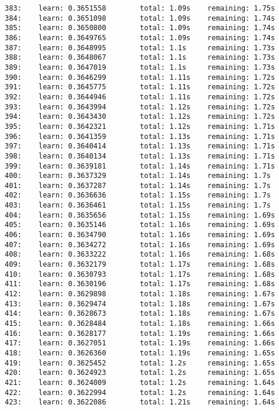 \documentclass[11pt]{article}
\begin{document}
\begin{Verbatim}[commandchars=\\\{\}]
383:    learn: 0.3651558        total: 1.09s    remaining: 1.75s
384:    learn: 0.3651098        total: 1.09s    remaining: 1.74s
385:    learn: 0.3650800        total: 1.09s    remaining: 1.74s
386:    learn: 0.3649765        total: 1.09s    remaining: 1.74s
387:    learn: 0.3648995        total: 1.1s     remaining: 1.73s
388:    learn: 0.3648067        total: 1.1s     remaining: 1.73s
389:    learn: 0.3647019        total: 1.1s     remaining: 1.73s
390:    learn: 0.3646299        total: 1.11s    remaining: 1.72s
391:    learn: 0.3645775        total: 1.11s    remaining: 1.72s
392:    learn: 0.3644946        total: 1.11s    remaining: 1.72s
393:    learn: 0.3643994        total: 1.12s    remaining: 1.72s
394:    learn: 0.3643430        total: 1.12s    remaining: 1.72s
395:    learn: 0.3642321        total: 1.12s    remaining: 1.71s
396:    learn: 0.3641359        total: 1.13s    remaining: 1.71s
397:    learn: 0.3640414        total: 1.13s    remaining: 1.71s
398:    learn: 0.3640134        total: 1.13s    remaining: 1.71s
399:    learn: 0.3639181        total: 1.14s    remaining: 1.71s
400:    learn: 0.3637329        total: 1.14s    remaining: 1.7s
401:    learn: 0.3637287        total: 1.14s    remaining: 1.7s
402:    learn: 0.3636636        total: 1.15s    remaining: 1.7s
403:    learn: 0.3636461        total: 1.15s    remaining: 1.7s
404:    learn: 0.3635656        total: 1.15s    remaining: 1.69s
405:    learn: 0.3635146        total: 1.16s    remaining: 1.69s
406:    learn: 0.3634790        total: 1.16s    remaining: 1.69s
407:    learn: 0.3634272        total: 1.16s    remaining: 1.69s
408:    learn: 0.3633222        total: 1.16s    remaining: 1.68s
409:    learn: 0.3632179        total: 1.17s    remaining: 1.68s
410:    learn: 0.3630793        total: 1.17s    remaining: 1.68s
411:    learn: 0.3630196        total: 1.17s    remaining: 1.68s
412:    learn: 0.3629898        total: 1.18s    remaining: 1.67s
413:    learn: 0.3629474        total: 1.18s    remaining: 1.67s
414:    learn: 0.3628673        total: 1.18s    remaining: 1.67s
415:    learn: 0.3628484        total: 1.18s    remaining: 1.66s
416:    learn: 0.3628177        total: 1.19s    remaining: 1.66s
417:    learn: 0.3627051        total: 1.19s    remaining: 1.66s
418:    learn: 0.3626360        total: 1.19s    remaining: 1.65s
419:    learn: 0.3625452        total: 1.2s     remaining: 1.65s
420:    learn: 0.3624923        total: 1.2s     remaining: 1.65s
421:    learn: 0.3624009        total: 1.2s     remaining: 1.64s
422:    learn: 0.3622994        total: 1.2s     remaining: 1.64s
423:    learn: 0.3622086        total: 1.21s    remaining: 1.64s

\end{Verbatim}
\end{document}
